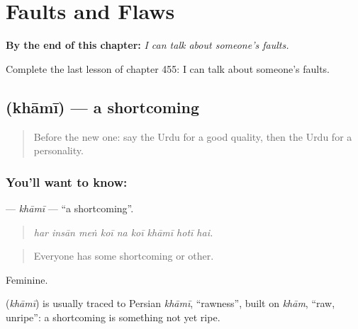 
\chapter{Faults and Flaws}
\label{ch:ur-faults-and-flaws}

\begin{chapteropening}
\textbf{By the end of this chapter:} \emph{I can talk about someone's faults.}

Complete the last lesson of chapter 455: I can talk about someone's faults.
\end{chapteropening}

\section[\texorpdfstring{\ur{خامی} (khāmī)}{خامی (khāmī)}]{ (khāmī) — a shortcoming}

\label{lesson:UR-C455-khami}



\begin{quote}
Before the new one: say the Urdu for a good quality, then the Urdu for a personality.
\end{quote}

\subsection*{You'll want to know: }
\textbf{} — \emph{khāmī} — \textquotedblleft{}a shortcoming\textquotedblright{}.

\begin{quote}
        
\end{quote}

\begin{quote}
\emph{har insān meṅ koī na koī khāmī hotī hai.}
\end{quote}

\begin{quote}
Everyone has some shortcoming or other.
\end{quote}

Feminine.

\begin{cousinweb}
\textbf{} (\emph{khāmī}) is usually traced to Persian \emph{khāmī}, \textquotedblleft{}rawness\textquotedblright{}, built on \emph{khām}, \textquotedblleft{}raw, unripe\textquotedblright{}: a shortcoming is something not yet ripe.
\end{cousinweb}

